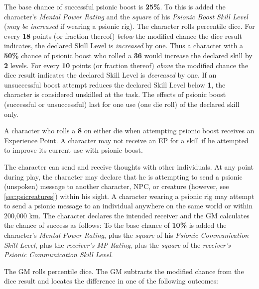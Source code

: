 The base chance of successful psionic boost is \textbf{25\%}.  To this
is added the character's \emph{Mental Power Rating} and the
\emph{square} of his \emph{Psionic Boost Skill Level} (\emph{may be
  increased} if wearing a psionic rig).  The character rolls percentile
dice.  For every \textbf{18} points (or fraction thereof) \emph{below}
the modified chance the dice result indicates, the declared Skill
Level is \emph{increased} by one.  Thus a character with a
\textbf{50\%} chance of psionic boost who rolled a \textbf{36} would
increase the declared skill by \textbf{2} levels.  For every
\textbf{10} points (or fraction thereof) \emph{above} the modified
chance the dice result indicates the declared Skill Level is
\emph{decreased} by one.  If an unsuccessful boost attempt reduces the
declared Skill Level below \textbf{1}, the character is considered
unskilled at the task.  The effects of psionic boost (successful or
unsuccessful) last for one use (one die roll) of the declared skill
only.

A character who rolls a \textbf{8} on either die when attempting
psionic boost receives an Experience Point.  A character may not
receive an EP for a skill if he attempted to improve its current use
with psionic boost.


\label{sec:skill-psionic-communication}

The character can send and receive thoughts with other individuals.  At
any point during play, the character may declare that he is attempting
to send a psionic (unspoken) message to another character, NPC, or
creature (however, see \ref{sec:psicreatures}) within his sight.
A character
wearing a psionic rig may attempt to send a psionic message to an
individual anywhere on the same world or within 200,000 km.
The character declares the intended receiver and the GM calculates the
chance of success as follows: To the base chance of \textbf{10\%} is added the
character's \emph{Mental Power Rating}, plus the \emph{square} of his
\emph{Psionic Communication Skill Level}, plus the \emph{receiver's MP
  Rating}, plus the \emph{square} of the \emph{receiver's Psionic
  Communication Skill Level}.

The GM rolls percentile dice.  The GM subtracts the modified chance
from the dice result and locates the difference in one of the
following outcomes:

